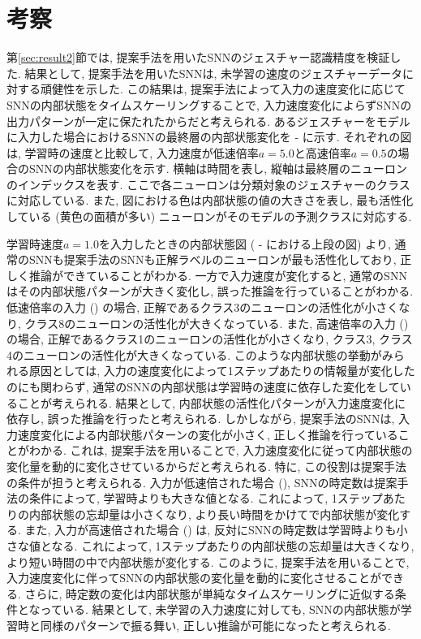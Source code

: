 \section{考察}
第\ref{sec:result2}節では, 提案手法を用いたSNNのジェスチャー認識精度を検証した.
結果として, 提案手法を用いたSNNは, 未学習の速度のジェスチャーデータに対する頑健性を示した.
この結果は, 提案手法によって入力の速度変化に応じてSNNの内部状態をタイムスケーリングすることで, 入力速度変化によらずSNNの出力パターンが一定に保たれたからだと考えられる.
あるジェスチャーをモデルに入力した場合におけるSNNの最終層の内部状態変化を - に示す.
それぞれの図は, 学習時の速度と比較して, 入力速度が低速倍率$a=5.0$と高速倍率$a=0.5$の場合のSNNの内部状態変化を示す.
横軸は時間を表し, 縦軸は最終層のニューロンのインデックスを表す.
ここで各ニューロンは分類対象のジェスチャーのクラスに対応している.
また, 図における色は内部状態の値の大きさを表し, 最も活性化している (黄色の面積が多い) ニューロンがそのモデルの予測クラスに対応する.

学習時速度$a=1.0$を入力したときの内部状態図 ( - における上段の図) より, 通常のSNNも提案手法のSNNも正解ラベルのニューロンが最も活性化しており, 正しく推論ができていることがわかる.
一方で入力速度が変化すると, 通常のSNNはその内部状態パターンが大きく変化し, 誤った推論を行っていることがわかる.
低速倍率の入力 () の場合, 正解であるクラス3のニューロンの活性化が小さくなり, クラス8のニューロンの活性化が大きくなっている.
また, 高速倍率の入力 () の場合, 正解であるクラス1のニューロンの活性化が小さくなり, クラス3, クラス4のニューロンの活性化が大きくなっている.
このような内部状態の挙動がみられる原因としては, 入力の速度変化によって1ステップあたりの情報量が変化したのにも関わらず, 通常のSNNの内部状態は学習時の速度に依存した変化をしていることが考えられる.
結果として, 内部状態の活性化パターンが入力速度変化に依存し, 誤った推論を行ったと考えられる.
しかしながら, 提案手法のSNNは, 入力速度変化による内部状態パターンの変化が小さく, 正しく推論を行っていることがわかる.
これは, 提案手法を用いることで, 入力速度変化に従って内部状態の変化量を動的に変化させているからだと考えられる.
特に, この役割は提案手法の条件が担うと考えられる.
入力が低速倍された場合 (), SNNの時定数は提案手法の条件によって, 学習時よりも大きな値となる.
これによって, 1ステップあたりの内部状態の忘却量は小さくなり, より長い時間をかけてで内部状態が変化する.
また, 入力が高速倍された場合 () は, 反対にSNNの時定数は学習時よりも小さな値となる.
これによって, 1ステップあたりの内部状態の忘却量は大きくなり, より短い時間の中で内部状態が変化する.
このように, 提案手法を用いることで, 入力速度変化に伴ってSNNの内部状態の変化量を動的に変化させることができる.
さらに, 時定数の変化は内部状態が単純なタイムスケーリングに近似する条件となっている.
結果として, 未学習の入力速度に対しても, SNNの内部状態が学習時と同様のパターンで振る舞い, 正しい推論が可能になったと考えられる.

